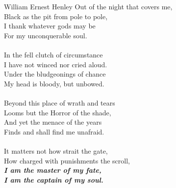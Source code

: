 \documentclass[bsc, classic, a4paper, oneside]{ufbathesis}
\begin{document}
\begin{epigraph}[Invictus]{William Ernest Henley}
Out of the night that covers me,\\
Black as the pit from pole to pole,\\
I thank whatever gods may be\\
For my unconquerable soul.\\~\\

In the fell clutch of circumstance\\
I have not winced nor cried aloud.\\
Under the bludgeonings of chance\\
My head is bloody, but unbowed.\\~\\

Beyond this place of wrath and tears\\
Looms but the Horror of the shade,\\
And yet the menace of the years\\
Finds and shall find me unafraid.\\~\\

It matters not how strait the gate,\\
How charged with punishments the scroll,\\
\textit{\textbf{I am the master of my fate,\\
I am the captain of my soul.}}
\end{epigraph}


\resumo



\abstract




\tableofcontents

\listoffigures

\listoftables

\mainmatter

% 
% 
% 
%
\end{document}
